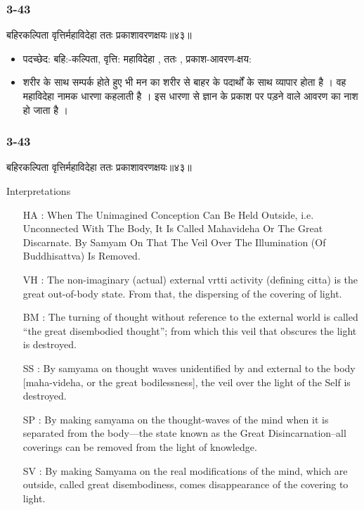\begin{frame}[fragile]\frametitle{3-43}
\begin{sanskrit}
बहिरकल्पिता वृत्तिर्महाविदेहा ततः प्रकाशावरणक्षयः॥४३॥
\end{sanskrit}

\begin{itemize}
\item पदच्छेद: बहि:-कल्पिता, वृत्ति: महाविदेहा , ततः , प्रकाश-आवरण-क्षय:
\item शरीर के साथ सम्पर्क होते हुए भी मन का शरीर से बाहर के पदार्थों के साथ व्यापार होता है । वह महाविदेहा नामक धारणा कहलाती है । इस धारणा से ज्ञान के प्रकाश पर पड़ने वाले आवरण का नाश हो जाता है ।
\end{itemize}
\end{frame}

\begin{frame}[fragile]\frametitle{3-43}
\begin{sanskrit}
बहिरकल्पिता वृत्तिर्महाविदेहा ततः प्रकाशावरणक्षयः॥४३॥
\end{sanskrit}

Interpretations
\begin{itemize}	
\item [HA]: When The Unimagined Conception Can Be Held Outside, i.e. Unconnected With The Body, It Is Called Mahavideha Or The Great Discarnate. By Samyam On That The Veil Over The Illumination (Of Buddhisattva) Is Removed.		
\item [VH]: The non-imaginary (actual) external vrtti activity (defining citta) is the great out-of-body state. From that, the dispersing of the covering of light.
\item [BM]: The turning of thought without reference to the external world is called “the great disembodied thought”; from which this veil that obscures the light is destroyed.
\item [SS]: By samyama on thought waves unidentified by and external to the body [maha-videha, or the great bodilessness], the veil over the light of the Self is destroyed.
\item [SP]: By making samyama on the thought-waves of the mind when it is separated from the body—the state known as the Great Disincarnation–all coverings can be removed from the light of knowledge.
\item [SV]: By making Samyama on the real modifications of the mind, which are outside, called great disembodiness, comes disappearance of the covering to light. 
\end{itemize}
\end{frame}



